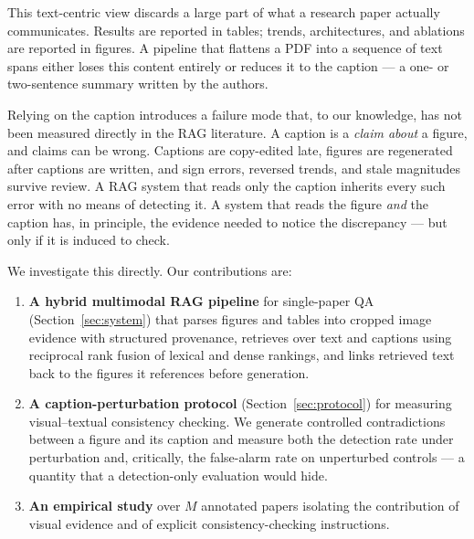 \documentclass[conference]{IEEEtran}
\newif\ifdraftmode
\newcommand{\TODO}[1]{\ifdraftmode\textcolor{red}{\textbf{[TODO: #1]}}\fi}
\newcommand{\NUM}[1]{\ifdraftmode\textcolor{red}{\textbf{[#1]}}\else#1\fi}
\begin{document}
This text-centric view discards a large part of what a research paper actually
communicates. Results are reported in tables; trends, architectures, and
ablations are reported in figures. A pipeline that flattens a PDF into a
sequence of text spans either loses this content entirely or reduces it to the
caption --- a one- or two-sentence summary written by the authors.

Relying on the caption introduces a failure mode that, to our knowledge, has
not been measured directly in the RAG literature. A caption is a
\emph{claim about} a figure, and claims can be wrong. Captions are copy-edited
late, figures are regenerated after captions are written, and sign errors,
reversed trends, and stale magnitudes survive review. A RAG system that reads
only the caption inherits every such error with no means of detecting it. A
system that reads the figure \emph{and} the caption has, in principle, the
evidence needed to notice the discrepancy --- but only if it is induced to
check.

We investigate this directly. Our contributions are:

\begin{enumerate}
  \item \textbf{A hybrid multimodal RAG pipeline} for single-paper QA
  (Section~\ref{sec:system}) that parses figures and tables into cropped
  image evidence with structured provenance, retrieves over text and captions
  using reciprocal rank fusion of lexical and dense rankings, and links
  retrieved text back to the figures it references before generation.

  \item \textbf{A caption-perturbation protocol} (Section~\ref{sec:protocol})
  for measuring visual--textual consistency checking. We generate controlled
  contradictions between a figure and its caption and measure both the
  detection rate under perturbation and, critically, the false-alarm rate on
  unperturbed controls --- a quantity that a detection-only evaluation would
  hide.

  \item \textbf{An empirical study} over \NUM{$M$} annotated papers
  isolating the contribution of visual evidence and of explicit
  consistency-checking instructions.
  \TODO{finalise claim once Section V exists}
\end{enumerate}

\TODO{Add a Figure 1: side-by-side of a figure whose caption contradicts it,
with the system's flagged output. This is the paper's hook and reviewers will
look for it on page 1.}
\end{document}

